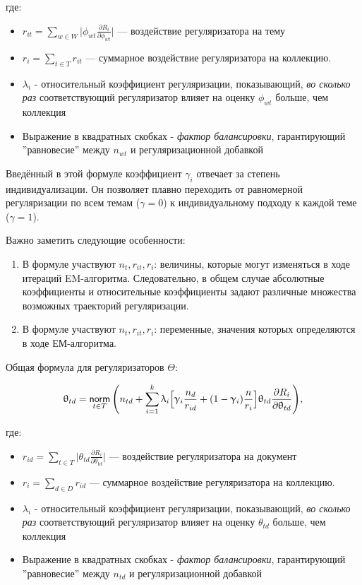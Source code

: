 где: 
\begin{itemize}
    \item{$r_{it} = \sum_{w\in W} \Big| \phi_{wt} \frac{\partial R_i}{\partial \phi_{wt}} \Big| $ --- воздействие регуляризатора на тему}
    \item { $r_{i} = \sum_{t\in T} r_{it}$ --- суммарное воздействие регуляризатора на коллекцию.}
    \item { $\lambda_i$ - относительный коэффициент регуляризации, показывающий, \emph{во сколько раз} соответствующий регуляризатор влияет на оценку $\phi_{wt}$ больше, чем коллекция}
    \item {Выражение в квадратных скобках - \textit{фактор балансировки}, гарантирующий ''равновесие'' между $n_{wt}$ и регуляризационной добавкой}
\end{itemize}

Введённый в этой формуле коэффициент $\gamma_i$ отвечает за степень индивидуализации. Он позволяет плавно переходить от равномерной регуляризации по всем темам ($\gamma = 0$) к индивидуальному подходу к каждой теме ($\gamma = 1$).

Важно заметить следующие особенности: 
\begin{enumerate}
    \item {В формуле участвуют $n_t, r_{it}, r_{i}$:  величины, которые могут изменяться в ходе итераций EM-алгоритма. Следовательно, в общем случае
    абсолютные коэффициенты и относительные  коэффициенты задают различные множества возможных траекторий регуляризации.}
    \item  {В формуле участвуют $n_t, r_{it}, r_{i}$: переменные, значения которых определяются в ходе ЕМ-алгоритма.}
\end{enumerate}

Общая формула для регуляризаторов $\Theta$:

\[
\uptheta_{td} = \mathop{\mathsf{norm}}\limits_{t \in T} \Bigg( 
    n_{td} + \sum_{i=1}^k \uplambda_i \Big[
        \upgamma_i \frac{n_d}{r_{id}} + (1-\upgamma_i)\frac{n}{r_i}
        \Big] 
    \uptheta_{td} \frac{\partial R_i}{\partial \uptheta_{td}}
\Bigg), \label{rel_theta_general}
\]

где: 
\begin{itemize}
    \item { $r_{id} = \sum_{t\in T} \Big | \theta_{td} \frac{\partial R_i}{\partial \theta_{td}} \Big | $ --- воздействие регуляризатора на документ}
    \item { $r_{i} = \sum_{d\in D} r_{id}$ --- суммарное воздействие регуляризатора на коллекцию.}
    \item { $\lambda_i$ - относительный коэффициент регуляризации, показывающий, \emph{во сколько раз} соответствующий регуляризатор влияет на оценку $\theta_{td}$ больше, чем коллекция}
    \item {Выражение в квадратных скобках - \textit{фактор балансировки}, гарантирующий ''равновесие'' между $n_{td}$ и регуляризационной добавкой}
\end{itemize}

